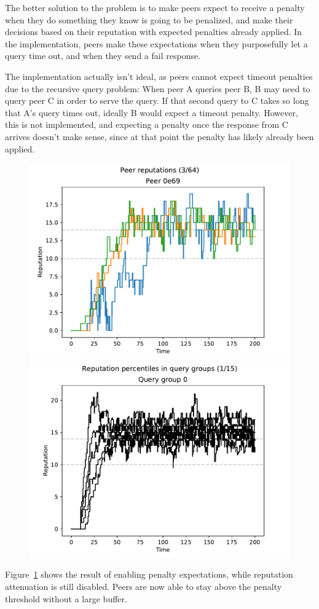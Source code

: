 The better solution to the problem is to make peers expect to receive a penalty
when they do something they know is going to be penalized, and make their
decisions based on their reputation with expected penalties already applied. In
the implementation, peers make these expectations when they purposefully let a
query time out, and when they send a fail response.

The implementation actually isn't ideal, as peers cannot expect timeout
penalties due to the recursive query problem: When peer A queries peer B, B may
need to query peer C in order to serve the query. If that second query to C
takes so long that A's query times out, ideally B would expect a timeout
penalty. However, this is not implemented, and expecting a penalty once the
response from C arrives doesn't make sense, since at that point the penalty has
likely already been applied.

\begin{figure}[t]
\centering
\includegraphics[width=0.5\columnwidth]{figures/expectations_on_no_att_peer_reps_3_of_64}%
\includegraphics[width=0.5\columnwidth]{figures/expectations_on_no_att_rep_percs_1_of_15}
\label{fig:penalty_expectations_on_no_att_peer_reps_percs}
\end{figure}

Figure~\ref{fig:penalty_expectations_on_no_att_peer_reps_percs} shows the result
of enabling penalty expectations, while reputation attenuation is still
disabled. Peers are now able to stay above the penalty threshold without a large
buffer.

